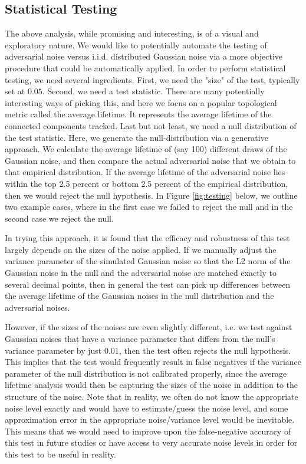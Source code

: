 \documentclass[twoside,twocolumn]{article}
\begin{document}
\subsection{Statistical Testing}

The above analysis, while promising and interesting, is of a visual and exploratory nature. We would like to potentially automate the testing of adversarial noise versus i.i.d. distributed Gaussian noise via a more objective procedure that could be automatically applied. In order to perform statistical testing, we need several ingredients. First, we need the "size" of the test, typically set at $0.05$. Second, we need a test statistic. There are many potentially interesting ways of picking this, and here we focus on a popular topological metric called the average lifetime. It represents the average lifetime of the connected components tracked. Last but not least, we need a null distribution of the test statistic. Here, we generate the null-distribution via a generative approach. We calculate the average lifetime of (say 100) different draws of the Gaussian noise, and then compare the actual adversarial noise that we obtain to that empirical distribution. If the average lifetime of the adversarial noise lies within the top 2.5 percent or bottom 2.5 percent of the empirical distribution, then we would reject the null hypothesis. In Figure \ref{fig:testing} below, we outline two example cases, where in the first case we failed to reject the null and in the second case we reject the null. 

In trying this approach, it is found that the efficacy and robustness of this test largely depends on the sizes of the noise applied. If we manually adjust the variance parameter of the simulated Gaussian noise so that the L2 norm of the Gaussian noise in the null and the adversarial noise are matched exactly to several decimal points, then in general the test can pick up differences between the average lifetime of the Gaussian noises in the null distribution and the adversarial noises. 

However, if the sizes of the noises are even slightly different, i.e. we test against Gaussian noises that have a variance parameter that differs from the null's variance parameter by just $0.01$, then the test often rejects the null hypothesis. This implies that the test would frequently result in false negatives if the variance parameter of the null distribution is not calibrated properly, since the average lifetime analysis would then be capturing the sizes of the noise in addition to the structure of the noise.  Note that in reality, we often do not know the appropriate noise level exactly and would have to estimate/guess the noise level, and some approximation error in the appropriate noise/variance level would be inevitable. This means that we would need to improve upon the false-negative accuracy of this test in future studies or have access to very accurate noise levels in order for this test to be useful in reality.
\end{document}
